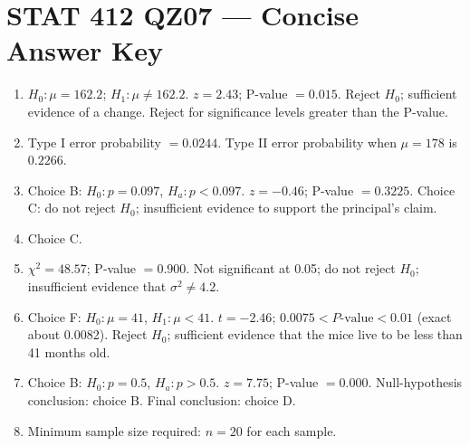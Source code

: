 \documentclass[11pt]{article}
\begin{document}
\section*{STAT 412 QZ07 --- Concise Answer Key}
\begin{enumerate}[label=\textbf{\arabic*.}]
\item $H_0:\mu=162.2$; $H_1:\mu\ne162.2$. $z=2.43$; P-value $=0.015$. Reject $H_0$; sufficient evidence of a change. Reject for significance levels greater than the P-value.
\item Type I error probability $=0.0244$. Type II error probability when $\mu=178$ is $0.2266$.
\item Choice B: $H_0:p=0.097$, $H_a:p<0.097$. $z=-0.46$; P-value $=0.3225$. Choice C: do not reject $H_0$; insufficient evidence to support the principal's claim.
\item Choice C.
\item $\chi^2=48.57$; P-value $=0.900$. Not significant at 0.05; do not reject $H_0$; insufficient evidence that $\sigma^2\ne4.2$.
\item Choice F: $H_0:\mu=41$, $H_1:\mu<41$. $t=-2.46$; $0.0075 < P\text{-value} < 0.01$ (exact about 0.0082). Reject $H_0$; sufficient evidence that the mice live to be less than 41 months old.
\item Choice B: $H_0:p=0.5$, $H_a:p>0.5$. $z=7.75$; P-value $=0.000$. Null-hypothesis conclusion: choice B. Final conclusion: choice D.
\item Minimum sample size required: $n=20$ for each sample.
\end{enumerate}
\end{document}

